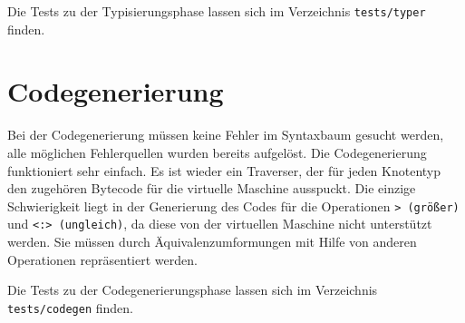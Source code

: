 \documentclass[a4paper,11pt,titlepage,openany,oneside]{scrbook}
\begin{document}
Die Tests zu der Typisierungsphase lassen sich im Verzeichnis \texttt{tests/typer} finden.

\chapter{Codegenerierung}

Bei der Codegenerierung müssen keine Fehler im Syntaxbaum gesucht werden, alle möglichen Fehlerquellen wurden bereits aufgelöst. Die Codegenerierung funktioniert sehr einfach. Es ist wieder ein Traverser, der für jeden Knotentyp den zugehören Bytecode für die virtuelle Maschine ausspuckt. Die einzige Schwierigkeit liegt in der Generierung des Codes für die Operationen \texttt{> (größer)} und \texttt{<:> (ungleich)}, da diese von der virtuellen Maschine nicht unterstützt werden. Sie müssen durch Äquivalenzumformungen mit Hilfe von anderen Operationen repräsentiert werden.

Die Tests zu der Codegenerierungsphase lassen sich im Verzeichnis \texttt{tests/codegen} finden.
\end{document}
